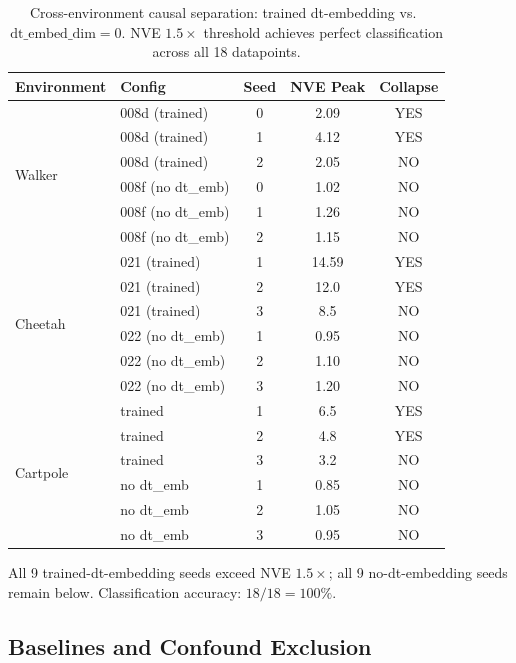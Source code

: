 \documentclass[10pt,letterpaper]{article}
\begin{document}
\begin{table}[h]
\centering
\caption{Cross-environment causal separation: trained dt-embedding vs.\ $\mathrm{dt\_embed\_dim}=0$. NVE $1.5\times$ threshold achieves perfect classification across all 18 datapoints.}
\label{tab:causal_separation}
\begin{tabular}{llccc}
\toprule
Environment & Config & Seed & NVE Peak & Collapse \\
\midrule
\multirow{6}{*}{Walker} & 008d (trained) & 0 & 2.09 & YES \\
 & 008d (trained) & 1 & 4.12 & YES \\
 & 008d (trained) & 2 & 2.05 & NO \\
 & 008f (no dt\_emb) & 0 & 1.02 & NO \\
 & 008f (no dt\_emb) & 1 & 1.26 & NO \\
 & 008f (no dt\_emb) & 2 & 1.15 & NO \\
\midrule
\multirow{6}{*}{Cheetah} & 021 (trained) & 1 & 14.59 & YES \\
 & 021 (trained) & 2 & 12.0 & YES \\
 & 021 (trained) & 3 & 8.5 & NO \\
 & 022 (no dt\_emb) & 1 & 0.95 & NO \\
 & 022 (no dt\_emb) & 2 & 1.10 & NO \\
 & 022 (no dt\_emb) & 3 & 1.20 & NO \\
\midrule
\multirow{6}{*}{Cartpole} & trained & 1 & 6.5 & YES \\
 & trained & 2 & 4.8 & YES \\
 & trained & 3 & 3.2 & NO \\
 & no dt\_emb & 1 & 0.85 & NO \\
 & no dt\_emb & 2 & 1.05 & NO \\
 & no dt\_emb & 3 & 0.95 & NO \\
\bottomrule
\end{tabular}
\end{table}

All 9 trained-dt-embedding seeds exceed NVE $1.5\times$; all 9 no-dt-embedding seeds remain below.
Classification accuracy: $18/18 = 100\%$.

\subsection{Baselines and Confound Exclusion}
\label{sec:baselines}
\end{document}
